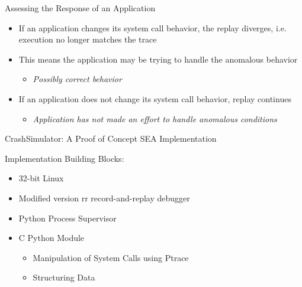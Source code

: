\documentclass[pdf]{beamer}
\begin{document}
%
%


\begin{frame}{Assessing the Response of an Application}
  \begin{itemize}
  \item{If an application changes its system call behavior, the replay diverges,
      i.e. execution no longer matches the trace}
  \item{This means the application may be trying to handle the anomalous behavior}
    \begin{itemize}
    \item{\textit{Possibly correct behavior}}
    \end{itemize}
  \item{If an application does not change its system call behavior, replay
      continues}
    \begin{itemize}
    \item{\textit{Application has not made an effort to handle anomalous conditions}}
    \end{itemize}
  \end{itemize}
\end{frame}


\begin{frame}{CrashSimulator: A Proof of Concept SEA Implementation}

  Implementation Building Blocks:

  \begin{itemize}
  \item{32-bit Linux}
  \item{Modified version rr record-and-replay debugger}
  \item{Python Process Supervisor}
  \item{C Python Module}
    \begin{itemize}
    \item{Manipulation of System Calls using Ptrace}
    \item{Structuring Data}
    \end{itemize}
  \end{itemize}
\end{frame}
\end{document}
